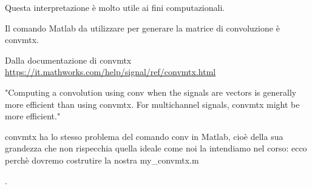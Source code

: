 Questa interpretazione è molto utile ai fini computazionali. \newline 

Il comando Matlab da utilizzare per generare la matrice di convoluzione è convmtx. \newline 


\begin{tcolorbox}
    Dalla documentazione di convmtx \\\url{https://it.mathworks.com/help/signal/ref/convmtx.html} \newline 

    "Computing a convolution using conv when the signals are vectors is generally more efficient than using convmtx. For multichannel signals, convmtx might be more efficient." \newline 

    convmtx ha lo stesso problema del comando conv in Matlab, 
    cioè della sua grandezza che non rispecchia quella ideale come noi la intendiamo nel corso: 
    ecco perchè dovremo costrutire la nostra my\_convmtx.m 

\end{tcolorbox} 

\newpage 
. 

\newpage 